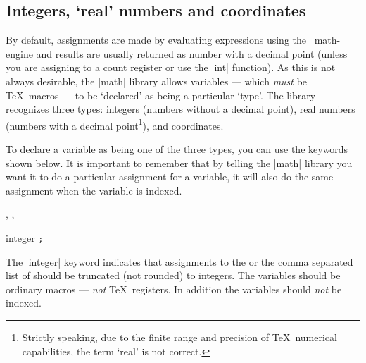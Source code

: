 \subsection{Integers, `real' numbers and coordinates}
	
	By default, assignments are made by evaluating expressions
	using the \pgfname\ math-engine and 
	results	are usually returned as number with a decimal point (unless you
	are assigning to a count register or use the |int| function).
	As this is not always desirable, the |math| library allows
	variables --- which \emph{must} be \TeX\ macros --- to be `declared'
	as being a particular `type'. The library recognizes three types:
	integers (numbers without a decimal point),
	real numbers (numbers with a decimal point\footnote{Strictly speaking, due to the 
	finite range and precision of \TeX\ numerical capabilities, the term `real' is
	not correct.}), and coordinates.
	
	To declare a variable as being one of the three types,
	you  can use the keywords shown below. It is important to remember
	that by telling the |math| library you want it to do a
	particular assignment for a variable, it will also do the same 
	assignment when the variable is indexed.
	
\begin{codeexample}[]
, , 
\end{codeexample}



\begin{math-keyword}{{integer} \texttt{;}}

	The |integer| keyword indicates that assignments to the  or 
	the comma separated list of  should be 
	truncated (not rounded) to integers. The variables should be ordinary 
	macros --- \emph{not} \TeX\ registers. In addition the variables
	should \emph{not} be indexed. 

\begin{codeexample}[]
\end{codeexample}

\end{math-keyword}

